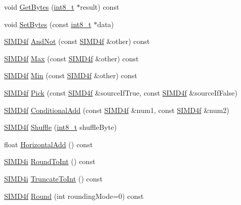 \begin{DoxyCompactItemize}
\item 
void \hyperlink{class_s_i_m_d4f_ab22b61011c8d8fa4007025018a97ef17}{Get\+Bytes} (\hyperlink{simddefines_8h_aef44329758059c91c76d334e8fc09700}{int8\+\_\+t} $\ast$result) const 
\item 
void \hyperlink{class_s_i_m_d4f_a4e6d88bddd43495f3c3fa94f4ae1f54c}{Set\+Bytes} (const \hyperlink{simddefines_8h_aef44329758059c91c76d334e8fc09700}{int8\+\_\+t} $\ast$data)
\item 
\hyperlink{class_s_i_m_d4f}{S\+I\+M\+D4f} \hyperlink{class_s_i_m_d4f_a08c9afbd07340f8f094c7337683fdc9f}{And\+Not} (const \hyperlink{class_s_i_m_d4f}{S\+I\+M\+D4f} \&other) const 
\item 
\hyperlink{class_s_i_m_d4f}{S\+I\+M\+D4f} \hyperlink{class_s_i_m_d4f_ac6e26ef1ca79d1e7c65e52899c2869cb}{Max} (const \hyperlink{class_s_i_m_d4f}{S\+I\+M\+D4f} \&other) const 
\item 
\hyperlink{class_s_i_m_d4f}{S\+I\+M\+D4f} \hyperlink{class_s_i_m_d4f_a939bad777bd0c1852d55dcb220b40f68}{Min} (const \hyperlink{class_s_i_m_d4f}{S\+I\+M\+D4f} \&other) const 
\item 
\hyperlink{class_s_i_m_d4f}{S\+I\+M\+D4f} \hyperlink{class_s_i_m_d4f_a2eb197707b1e028665b4ab5399b98e58}{Pick} (const \hyperlink{class_s_i_m_d4f}{S\+I\+M\+D4f} \&source\+If\+True, const \hyperlink{class_s_i_m_d4f}{S\+I\+M\+D4f} \&source\+If\+False)
\item 
\hyperlink{class_s_i_m_d4f}{S\+I\+M\+D4f} \hyperlink{class_s_i_m_d4f_a076452ebd64a5f9321250fca245cbfbc}{Conditional\+Add} (const \hyperlink{class_s_i_m_d4f}{S\+I\+M\+D4f} \&num1, const \hyperlink{class_s_i_m_d4f}{S\+I\+M\+D4f} \&num2)
\item 
\hyperlink{class_s_i_m_d4f}{S\+I\+M\+D4f} \hyperlink{class_s_i_m_d4f_ad295a893eafcfd63abb66cda02192ad0}{Shuffle} (\hyperlink{simddefines_8h_aef44329758059c91c76d334e8fc09700}{int8\+\_\+t} shuffle\+Byte)
\item 
float \hyperlink{class_s_i_m_d4f_a817d0e6bbe46b7dd609188ee73448218}{Horizontal\+Add} () const 
\item 
\hyperlink{class_s_i_m_d4i}{S\+I\+M\+D4i} \hyperlink{class_s_i_m_d4f_afdead05a92f34598d362975c7ec1661c}{Round\+To\+Int} () const 
\item 
\hyperlink{class_s_i_m_d4i}{S\+I\+M\+D4i} \hyperlink{class_s_i_m_d4f_af3630cd24a3be6ca8485d858a1306440}{Truncate\+To\+Int} () const 
\item 
\hyperlink{class_s_i_m_d4f}{S\+I\+M\+D4f} \hyperlink{class_s_i_m_d4f_a6aae2c276b8194b8d3c8ff4c9f6c619e}{Round} (int rounding\+Mode=0) const 

\end{DoxyCompactItemize}
